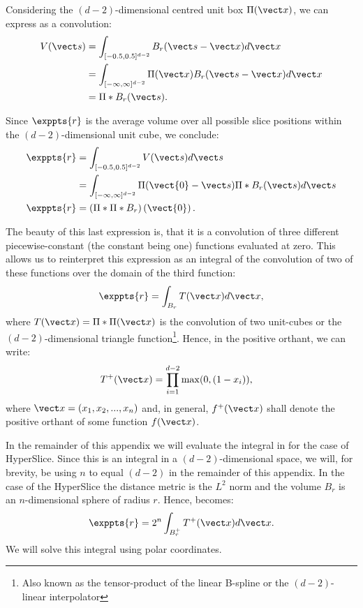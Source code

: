 
Considering the $(d-2)$-dimensional centred unit box $\Pi(\vx)$, we can express  as a convolution:
\begin{align*}
  V(\vs) &= \int_{[-0.5,0.5]^{d-2}} B_r(\vs-\vx) d\vx\\
          &= \int_{[-\infty,\infty]^{d-2}} \Pi(\vx) B_r(\vs-\vx) d\vx \\
          &= \Pi * B_r(\vs) \text{.}
\end{align*}

Since $\exppts{r}$ is the average volume over all possible slice positions within the $(d-2)$-dimensional unit cube, we conclude:
\begin{align*}
  \exppts{r} &= \int_{[-0.5,0.5]^{d-2}} V(\vs) d\vs \\
  	&= \int_{[-\infty,\infty]^{d-2}} \Pi(\vect{0}-\vs) \Pi * B_r(\vs) d\vs \\
  \exppts{r} &= \left( \Pi * \Pi * B_r \right) \left(\vect{0}\right) \text{.}
\end{align*}

The beauty of this last expression is, that it is a convolution of three different piecewise-constant (the constant being one) functions evaluated at zero. This allows us to reinterpret this expression as an integral of the convolution of two of these functions over the domain of the third function:
\begin{equation}
  \exppts{r} = \int_{B_r} T(\vx) d\vx \text{,}
  \label{eq:Erd}
\end{equation}
where $T(\vx) = \Pi * \Pi (\vx)$ is the convolution of two unit-cubes or the $(d-2)$-dimensional triangle function\footnote{Also known as the tensor-product of the linear B-spline or the $(d-2)$-linear interpolator}. Hence, in the positive orthant, we can write:
\begin{align*}
  T^{+}(\vx) &= \prod_{i=1}^{d-2} \max(0,(1-x_i)) \text{,}
\end{align*}
where $\vx = (x_1, x_2, ..., x_n)$ and, in general, $f^{+}(\vx)$ shall denote the positive orthant of some function $f(\vx)$.


In the remainder of this appendix we will evaluate the integral in  for the case of HyperSlice. Since this is an integral in a $(d-2)$-dimensional space, we will, for brevity, be using $n$ to equal $(d-2)$ in the remainder of this appendix.
In the case of the HyperSlice the distance metric is the $L^2$ norm and the volume $B_r$ is an $n$-dimensional sphere of radius $r$. Hence,  becomes:
\begin{equation}
  \exppts{r} = 2^n \int_{B^{+}_r} T^{+}(\vx) d\vx \text{.}
  \label{eq:ErdConvH}
\end{equation}
We will solve this integral using polar coordinates.

